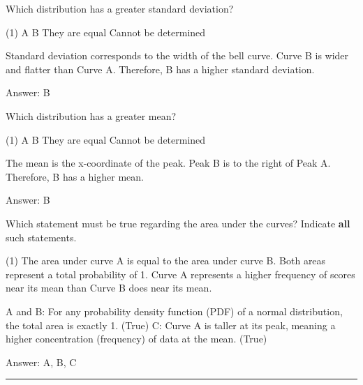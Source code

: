 \documentclass[11pt,paper=a4,answers]{exam}
\begin{document}
\begin{questions}
\question
Which distribution has a greater standard deviation?

\begin{tasks}(1)
\task[A)] A \task[B)] B \task[C)] They are equal \task[D)] Cannot be determined
\end{tasks}

\begin{solution}
Standard deviation corresponds to the width of the bell curve. Curve B is wider and flatter than Curve A.
\vspace{5pt}
Therefore, B has a higher standard deviation.

Answer: \colorbox{yellow!100}{B}
\end{solution}

\vspace{1cm}

\question
Which distribution has a greater mean?

\begin{tasks}(1)
\task[A)] A \task[B)] B \task[C)] They are equal \task[D)] Cannot be determined
\end{tasks}

\begin{solution}
The mean is the x-coordinate of the peak. Peak B is to the right of Peak A.
\vspace{5pt}
Therefore, B has a higher mean.

Answer: \colorbox{yellow!100}{B}
\end{solution}

\vspace{1cm}

\question
Which statement must be true regarding the area under the curves?
Indicate \textbf{all} such statements.

\begin{tasks}(1)
\task[A)] The area under curve A is equal to the area under curve B.
\task[B)] Both areas represent a total probability of 1.
\task[C)] Curve A represents a higher frequency of scores near its mean than Curve B does near its mean.
\end{tasks}

\begin{solution}
A and B: For any probability density function (PDF) of a normal distribution, the total area is exactly 1. (True)
\vspace{5pt}
C: Curve A is taller at its peak, meaning a higher concentration (frequency) of data at the mean. (True)

Answer: \colorbox{yellow!100}{A, B, C}
\end{solution}


\end{questions}
\begin{center}
\rule{.5\textwidth}{1pt}
\end{center}
\end{document}
